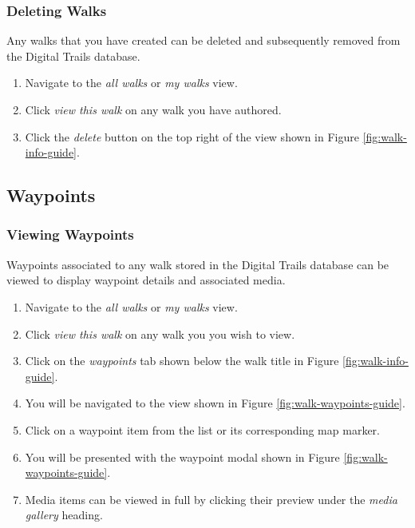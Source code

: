 \documentclass[11pt,a4paper]{report}
\begin{document}
\subsubsection{Deleting Walks}

Any walks that you have created can be deleted and subsequently removed from the Digital Trails database.

\begin{enumerate}
\item Navigate to the \emph{all walks} or \emph{my walks} view.
\item Click \emph{view this walk} on any walk you have authored.
\item Click the \emph{delete} button on the top right of the view shown in Figure \ref{fig:walk-info-guide}.
\end{enumerate}

\subsection{Waypoints}

\subsubsection{Viewing Waypoints}

Waypoints associated to any walk stored in the Digital Trails database can be viewed to display waypoint details and associated media.

\begin{enumerate}
\item Navigate to the \emph{all walks} or \emph{my walks} view.
\item Click \emph{view this walk} on any walk you you wish to view.
\item Click on the \emph{waypoints} tab shown below the walk title in Figure \ref{fig:walk-info-guide}.
\item You will be navigated to the view shown in Figure \ref{fig:walk-waypoints-guide}.
\item Click on a waypoint item from the list or its corresponding map marker.
\item You will be presented with the waypoint modal shown in Figure \ref{fig:walk-waypoints-guide}.
\item Media items can be viewed in full by clicking their preview under the \emph{media gallery} heading.
\end{enumerate}
\end{document}
